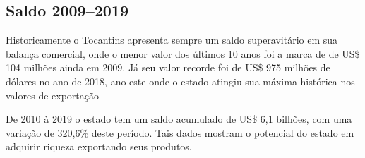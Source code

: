 \subsection{Saldo 2009--2019}

\par Historicamente o Tocantins apresenta sempre um saldo superavitário em sua balança comercial, onde o menor valor dos últimos 10 anos foi a marca de de US\$ 104 milhões ainda em 2009. Já seu valor recorde foi de US\$ 975 milhões de dólares no ano de 2018, ano este onde o estado atingiu sua máxima histórica nos valores de exportação

\par De 2010 à 2019 o estado tem um saldo acumulado de US\$ 6,1 bilhões, com uma variação de 320,6\% deste período. Tais dados mostram o potencial do estado em adquirir riqueza exportando seus produtos. 
